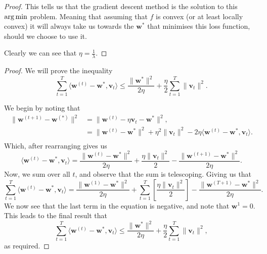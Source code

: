 \documentclass[twoside]{article}
\begin{document}
\begin{proof}
	This tells us that the gradient descent method is the solution to this $\operatorname*{arg\,min}$ problem. Meaning that
	assuming that $f$ is convex (or at least locally convex) it will always take us towards the $\bm{w}^{*}$
	that minimises this loss function, should we choose to use it.

	Clearly we can see that $\eta = \frac{1}{\lambda}$.
\end{proof}

\begin{proof}
	We will prove the inequality
	\begin{equation*}
		\sum_{t=1}^{T} \langle \bm{w}^{(t)} - \bm{w}^{*}, \bm{v}_{t}\rangle
		\leq \frac{\lVert \bm{w}^{*} \rVert^{2}}{2 \eta}
		+ \frac{\eta}{2}\sum_{t=1}^{T}\lVert \bm{v}_{t} \rVert^{2}.
	\end{equation*}

	We begin by noting that
	\begin{align*}
		\lVert \bm{w}^{(t+1)} - \bm{w}^{(*)} \rVert^{2}
		 & = \lVert \bm{w}^{(t)} - \eta \bm{v}_{t} - \bm{w}^{*} \rVert^{2},                                     \\
		 & = \lVert \bm{w}^{(t)} - \bm{w}^{*} \rVert^{2}
		+ \eta^{2} \lVert \bm{v}_{t} \rVert^{2} - 2 \eta \langle \bm{w}^{(t)} - \bm{w}^{*}, \bm{v}_{t} \rangle. \\
	\end{align*}
	Which, after rearranging gives us
	\begin{equation*}
		\langle \bm{w}^{(t)} - \bm{w}^{*}, \bm{v}_{t} \rangle
		= \frac{\lVert \bm{w}^{(t)} - \bm{w}^{*} \rVert^{2}}{2 \eta}
		+ \frac{\eta \lVert \bm{v}_{t} \rVert^{2}}{2}
		-  \frac{\lVert \bm{w}^{(t + 1)} - \bm{w}^{*} \rVert^{2}}{2 \eta}.
	\end{equation*}
	Now, we sum over all $t$, and observe that the sum is telescoping. Giving us that
	\begin{equation*}
		\sum_{t = 1}^{T} \langle \bm{w}^{(t)} - \bm{w}^{*}, \bm{v}_{t} \rangle
		= \frac{\lVert \bm{w}^{(1)} - \bm{w}^{*} \rVert^{2}}{2 \eta}
        + \sum_{t=1}^{T}\left[\frac{\eta \lVert \bm{v}_{t} \rVert^{2}}{2} \right]
		-  \frac{\lVert \bm{w}^{(T + 1)} - \bm{w}^{*} \rVert^{2}}{2 \eta}.
	\end{equation*}
	We now see that the last term in the equation is negative, and note that $\bm{w}^{1} = 0$.
	This leads to the final result that
	\begin{equation*}
		\sum_{t=1}^{T} \langle \bm{w}^{(t)} - \bm{w}^{*}, \bm{v}_{t}\rangle
		\leq \frac{\lVert \bm{w}^{*} \rVert^{2}}{2 \eta}
		+ \frac{\eta}{2}\sum_{t=1}^{T}\lVert \bm{v}_{t} \rVert^{2},
	\end{equation*}
	as required.

\end{proof}
\end{document}
